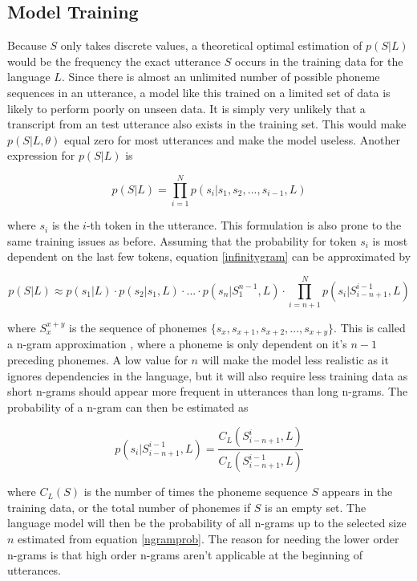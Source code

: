 \subsection{Model Training}
\label{modeltrain}

Because $S$ only takes discrete values, a theoretical optimal estimation of $p(S|L)$ would be the frequency the exact utterance $S$ occurs in the training data for the language $L$. Since there is almost an unlimited number of possible phoneme sequences in an utterance, a model like this trained on a limited set of data is likely to perform poorly on unseen data. It is simply very unlikely that a transcript from an test utterance also exists in the training set. This would make $p(S|L, \theta)$ equal zero for most utterances and make the model useless.  Another expression for $p(S|L)$ is

\begin{equation}\label{infinitygram}
p(S|L) = \prod_{i=1}^N p(s_i|s_1, s_2, ... , s_{i-1}, L)
\end{equation}

where $s_i$ is the $i$-th token in the utterance. This formulation is also prone to the same training issues as before. Assuming that the probability for token $s_i$ is most dependent on the last few tokens, equation \ref{infinitygram} can be approximated by

\begin{equation}\label{ngram}
p(S|L) \approx p(s_1| L)\cdot p(s_2| s_1, L)\cdot ... \cdot p(s_n|S_1^{n-1}, L) \cdot \prod_{i=n+1}^N p(s_i | S_{i-n+1}^{i-1}, L)
\end{equation}

where $S_{x}^{x+y}$ is the sequence of phonemes $\{s_x, s_{x+1}, s_{x+2}, ... , s_{x+y}\}$. This is called a n-gram approximation \cite[section 11.2.2]{talegk}, where a phoneme is only dependent on it's $n-1$ preceding phonemes. A low value for $n$ will make the model less realistic as it ignores dependencies in the language, but it will also require less training data as short n-grams should appear more frequent in utterances than long n-grams. The probability of a n-gram can then be estimated as

\begin{equation}\label{ngramprob}
p(s_i | S_{i-n+1}^{i-1}, L) = \frac{C_L(S_{i-n+1}^i, L)}{C_L(S_{i-n+1}^{i-1}, L)}
\end{equation}

where $C_L(S)$ is the number of times the phoneme sequence $S$ appears in the training data, or the total number of phonemes if $S$ is an empty set. The language model will then be the probability of all n-grams up to the selected size $n$ estimated from equation \ref{ngramprob}. The reason for needing the lower order n-grams is that high order n-grams aren't applicable at the beginning of utterances.

